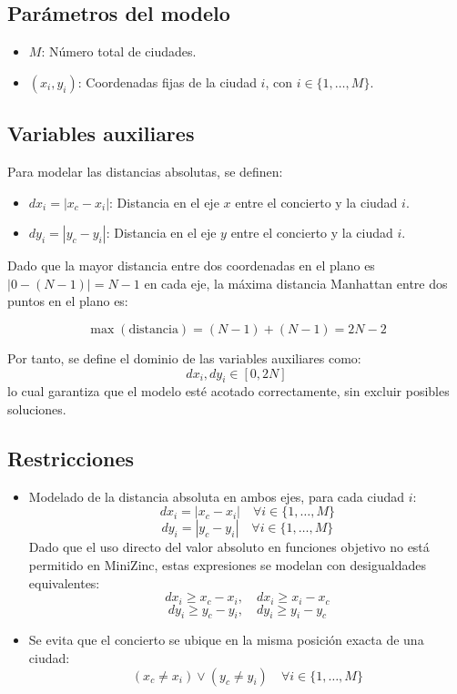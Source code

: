 \documentclass[conference]{IEEEtran}
\begin{document}
\subsection*{Parámetros del modelo}

\begin{itemize}
    \item $M$: Número total de ciudades.
    \item $(x_i, y_i)$: Coordenadas fijas de la ciudad $i$, con $i \in \{1, \dots, M\}$.
\end{itemize}

\subsection*{Variables auxiliares}

Para modelar las distancias absolutas, se definen:

\begin{itemize}
    \item $dx_i = |x_c - x_i|$: Distancia en el eje $x$ entre el concierto y la ciudad $i$.
    \item $dy_i = |y_c - y_i|$: Distancia en el eje $y$ entre el concierto y la ciudad $i$.
\end{itemize}

Dado que la mayor distancia entre dos coordenadas en el plano es $|0 - (N - 1)| = N - 1$ en cada eje, la máxima distancia Manhattan entre dos puntos en el plano es:

\[
\max(\text{distancia}) = (N - 1) + (N - 1) = 2N - 2
\]

Por tanto, se define el dominio de las variables auxiliares como:
\[
dx_i, dy_i \in [0, 2N]
\]
lo cual garantiza que el modelo esté acotado correctamente, sin excluir posibles soluciones.

\subsection*{Restricciones}

\begin{itemize}
    \item Modelado de la distancia absoluta en ambos ejes, para cada ciudad $i$:
    \[
    dx_i = |x_c - x_i| \quad \forall i \in \{1, \dots, M\}
    \]
    \[
    dy_i = |y_c - y_i| \quad \forall i \in \{1, \dots, M\}
    \]
    Dado que el uso directo del valor absoluto en funciones objetivo no está permitido en MiniZinc, estas expresiones se modelan con desigualdades equivalentes:
    \[
    dx_i \geq x_c - x_i,\quad dx_i \geq x_i - x_c
    \]
    \[
    dy_i \geq y_c - y_i,\quad dy_i \geq y_i - y_c
    \]

    \item Se evita que el concierto se ubique en la misma posición exacta de una ciudad:
    \[
    (x_c \ne x_i) \lor (y_c \ne y_i) \quad \forall i \in \{1, \dots, M\}
    \]
\end{itemize}
\end{document}
